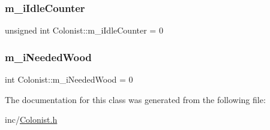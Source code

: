 \subsubsection{\texorpdfstring{m\+\_\+i\+Idle\+Counter}{m\_iIdleCounter}}
{\footnotesize\ttfamily unsigned int Colonist\+::m\+\_\+i\+Idle\+Counter = 0}

\mbox{\label{class_colonist_a835f8bfb0683d483f0c9ace75d9bcf59}} 
\subsubsection{\texorpdfstring{m\+\_\+i\+Needed\+Wood}{m\_iNeededWood}}
{\footnotesize\ttfamily int Colonist\+::m\+\_\+i\+Needed\+Wood = 0}



The documentation for this class was generated from the following file\+:\begin{DoxyCompactItemize}
\item 
inc/\mbox{\hyperlink{_colonist_8h}{Colonist.\+h}}\end{DoxyCompactItemize}

